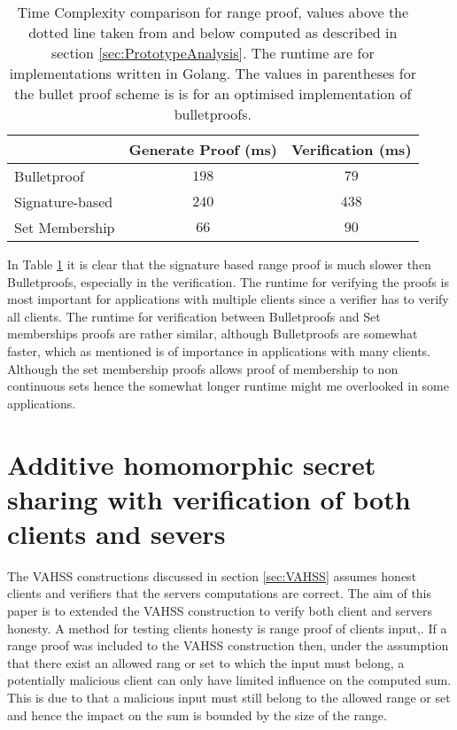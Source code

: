 \begin{table}
	\centering
	\caption{Time Complexity comparison for range proof, values above the dotted line taken from \cite{RANGE-SET} and below 				computed as described in section \ref{sec:PrototypeAnalysis}. The runtime are for implementations written in Golang. The values in parentheses for the bullet proof scheme is is for an optimised implementation of bulletproofs. }
	\label{tab:runtime}
	\begin{tabular}[t]{ l c c }
			 \toprule
    									 		&Generate Proof (ms)	&		Verification  (ms)\\ \midrule		
  			Bulletproof   				&   $ 198$   & $ 79$ 	\\
    			Signature-based 		&   $ 240 $   				&	$438$  \\
    			Set Membership 		&		$66$				&	$90$	\\
			\bottomrule		
	\end{tabular}
 \end{table}

 In Table \ref{tab:runtime} it is clear that the signature based range proof is much slower then Bulletproofs, especially  in the verification. The runtime for verifying the proofs is most important for applications with multiple clients since a verifier has to verify all clients. The runtime for verification between Bulletproofs and Set memberships proofs are rather similar, although Bulletproofs are somewhat faster, which as mentioned is of importance in applications with many clients. Although the set membership proofs allows proof of membership to non continuous sets hence the somewhat longer runtime might me overlooked in some applications. 
	
\section{Additive homomorphic secret sharing with verification of both clients and severs }
\label{sec:combination}

The  VAHSS constructions  discussed in section \ref{sec:VAHSS} assumes honest clients and verifiers that the servers computations are correct. The aim of this paper is to extended the VAHSS construction to verify both client and servers honesty.  A method for testing clients honesty is range proof of clients input,. If a range proof was included to the VAHSS construction then, under the assumption that there exist an allowed rang or set to which the input must belong, a potentially malicious client can only have limited influence on the computed sum. This is due to that a malicious input must still belong to the allowed range or set and hence the impact on the sum is bounded by the size of the range. 

